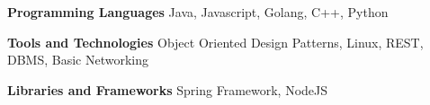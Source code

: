 

\begin{cvskills}

  \cvskill
  {\textbf{Programming Languages}}
  {Java, Javascript, Golang, C++, Python}

  \cvskill
	{\textbf{Tools and Technologies}}
    {Object Oriented Design Patterns, Linux, REST, DBMS, Basic Networking}

  \cvskill
  {\textbf{Libraries and Frameworks}}
  {Spring Framework, NodeJS}

\end{cvskills}